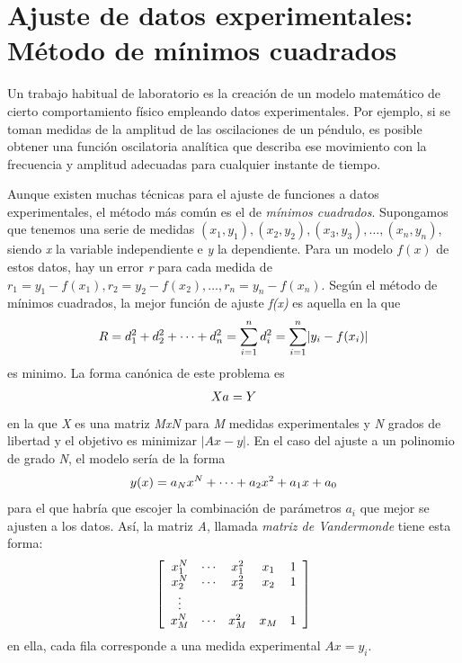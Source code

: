 \documentclass[letterpaper,10pt,spanish]{sphinxmanual}
\begin{document}
\chapter{Ajuste de datos experimentales: Método de mínimos cuadrados}
\label{ajustes:ajuste-de-datos-experimentales-metodo-de-minimos-cuadrados}\label{ajustes::doc}
Un trabajo habitual de laboratorio es la creación de un modelo
matemático de cierto comportamiento físico empleando datos
experimentales. Por ejemplo, si se toman medidas de la amplitud de las oscilaciones de un
péndulo,  es posible obtener una función oscilatoria
analítica que describa ese movimiento con la frecuencia y amplitud
adecuadas para cualquier instante de tiempo.

Aunque existen muchas técnicas para el ajuste de funciones a datos
experimentales, el método más común es el de \emph{mínimos cuadrados}.
Supongamos que tenemos una serie de medidas $(x_1, y_1), (x_2,
y_2), (x_3, y_3), \dots , (x_n, y_n)$, siendo \emph{x} la variable
independiente e \emph{y} la dependiente. Para un modelo $f(x)$ de
estos datos, hay un error \emph{r} para cada medida de $r_1
= y_1 -f(x_1), r_2 = y_2 -f(x_2), \dots ,  r_n = y_n -f(x_n)$. Según
el método de mínimos cuadrados, la mejor función de ajuste \emph{f(x)} es
aquella en la que
\begin{gather}
\begin{split}R = d_1^2 + d_2^2 + \dots + d_n^2 = \sum^n_{i=1} d^2_i = \sum^n_{i=1}  \lvert y_i - f(x_i)\rvert\end{split}\notag
\end{gather}
es minimo. La forma canónica de este problema es
\begin{gather}
\begin{split}Xa = Y\end{split}\notag
\end{gather}
en la que \emph{X} es una matriz \emph{MxN} para \emph{M} medidas experimentales y
\emph{N} grados de libertad y el objetivo es minimizar $\lvert Ax - y
\rvert$. En el caso del ajuste a un polinomio de grado \emph{N}, el modelo
sería de la forma
\begin{gather}
\begin{split}y(x) = a_Nx^N + \dots + a_2 x^2 + a_1x + a_0\end{split}\notag
\end{gather}
para el que habría que escojer la  combinación de parámetros
$a_i$ que mejor se ajusten a los datos. Así, la matriz \emph{A},
llamada \emph{matriz de Vandermonde} tiene esta forma:
\begin{gather}
\begin{split}\left[
\begin{array}{ c c c c c}
x_1^N & \cdots & x_1^2 & x_1 & 1 \\
x_2^N & \cdots & x_2^2 & x_2 & 1 \\
\vdots \\
x_M^N & \cdots & x_M^2 & x_M & 1 \\
\end{array}
\right]\end{split}\notag
\end{gather}
en ella, cada fila corresponde a una medida experimental $Ax =
y_i$.
\end{document}
